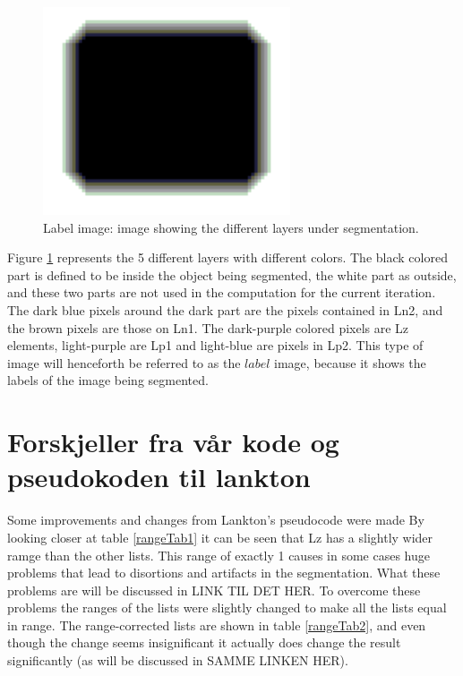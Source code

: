 \begin{figure}[h!]
\centering
\includegraphics[width=0.65\textwidth]{implemented/labelExample}
\caption{Label image: image showing the different layers under segmentation.}
\label{labelExample}
\end{figure}

Figure \ref{labelExample} represents the 5 different layers with different colors. The black colored part is defined to be inside the object being segmented, the white part as outside, and these two parts are not used in the computation for the current iteration. The dark blue pixels around the dark part are the pixels contained in Ln2, and the brown pixels are those on Ln1. The dark-purple colored pixels are Lz elements, light-purple are Lp1 and light-blue are pixels in Lp2. This type of image will henceforth be referred to as the $label$ image, because it shows the labels of the image being segmented.

\section{Forskjeller fra vår kode og pseudokoden til lankton}
Some improvements and changes from Lankton's pseudocode were made
By looking closer at table \ref{rangeTab1} it can be seen that Lz has a slightly wider ramge than the other lists. This range of exactly 1 causes in some cases huge problems that lead to disortions and artifacts in the segmentation. What these problems are will be discussed in LINK TIL DET HER. To overcome these problems the ranges of the lists were slightly changed to make all the lists equal in range. The range-corrected lists are shown in table \ref{rangeTab2}, and even though the change seems insignificant it actually does change the result significantly (as will be discussed in SAMME LINKEN HER).

